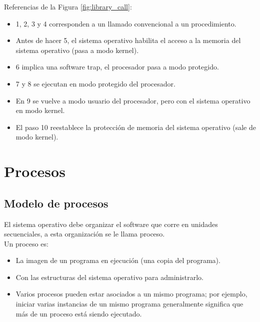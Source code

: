 \documentclass[a4paper, twoside]{article}
\begin{document}
Referencias de la Figura \ref{fig:library_call}:
\begin{itemize}
	\item 1, 2, 3 y 4 corresponden a un llamado convencional a un procedimiento.
	\item Antes de hacer 5, el sistema operativo habilita el acceso a la memoria del sistema operativo (pasa a modo kernel).
	\item 6 implica una software trap, el procesador pasa a modo protegido.
	\item 7 y 8 se ejecutan en modo protegido del procesador.
	\item En 9 se vuelve a modo usuario del procesador, pero con el sistema operativo en modo kernel.
	\item El paso 10 reestablece la protección de memoria del sistema operativo (sale de modo kernel).
\end{itemize}

\newpage
\section{Procesos}
\subsection{Modelo de procesos}
El sistema operativo debe organizar el software que corre en unidades secuenciales, a esta organización se le llama proceso.\\

Un proceso es:
\begin{itemize}
	\item La imagen de un programa en ejecución (una copia del programa).
	\item Con las estructuras del sistema operativo para administrarlo.
	\item Varios procesos pueden estar asociados a un mismo programa; por ejemplo, iniciar varias instancias de un mismo programa generalmente significa que más de un proceso está siendo ejecutado.
\end{itemize}
\end{document}
